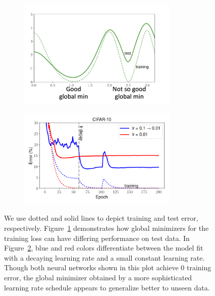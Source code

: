 \begin{enumerate}
\begin{figure}[t]
    \centering
    \begin{subfigure}[t]{0.49\textwidth}
        \centering
        \includegraphics[width=3in]{figures/bad global min .png}
        \caption{}
        \label{lec9:fig:bad-global-min}
    \end{subfigure}
    \hfill
    \begin{subfigure}[t]{0.49\textwidth}
        \centering
        \hspace*{-1.8em}
        \includegraphics[width=3in]{figures/deep-learning-implicit-reg.png}
        \caption{}
        \label{lec9:fig:dl-implicitreg}
    \end{subfigure}
    \caption{We use dotted and solid lines to depict training and test error, respectively. Figure~\ref{lec9:fig:bad-global-min} demonstrates how global minimizers for the training loss can have differing performance on test data. In Figure~\ref{lec9:fig:dl-implicitreg}, blue and red colors differentiate between the model fit with a decaying learning rate and a small constant learning rate. Though both neural networks shown in this plot achieve 0 training error, the global minimizer obtained by a more sophisticated learning rate schedule appears to generalize better to unseen data.}
    \label{lec9:fig:global_min}
\end{figure}


\end{enumerate}
